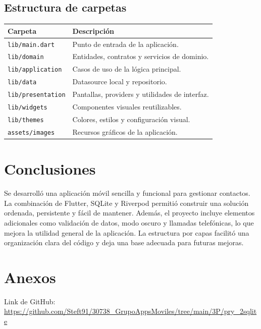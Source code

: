 \documentclass[12pt,a4paper]{article}
\begin{document}
\subsection{Estructura de carpetas}
\begin{longtable}{|p{}|p{}|}
\hline
\textbf{Carpeta} & \textbf{Descripción} \\
\hline
\texttt{lib/main.dart} & Punto de entrada de la aplicación. \\
\hline
\texttt{lib/domain} & Entidades, contratos y servicios de dominio. \\
\hline
\texttt{lib/application} & Casos de uso de la lógica principal. \\
\hline
\texttt{lib/data} & Datasource local y repositorio. \\
\hline
\texttt{lib/presentation} & Pantallas, providers y utilidades de interfaz. \\
\hline
\texttt{lib/widgets} & Componentes visuales reutilizables. \\
\hline
\texttt{lib/themes} & Colores, estilos y configuración visual. \\
\hline
\texttt{assets/images} & Recursos gráficos de la aplicación. \\
\hline
\end{longtable}

\section{Conclusiones}
Se desarrolló una aplicación móvil sencilla y funcional para gestionar contactos. La combinación de Flutter, SQLite y Riverpod permitió construir una solución ordenada, persistente y fácil de mantener. Además, el proyecto incluye elementos adicionales como validación de datos, modo oscuro y llamadas telefónicas, lo que mejora la utilidad general de la aplicación. La estructura por capas facilitó una organización clara del código y deja una base adecuada para futuras mejoras.

\section{Anexos}

Link de GitHub: \url{https://github.com/Steft91/30738_GrupoAppsMoviles/tree/main/3P/pry_2sqlite}



\end{document}
